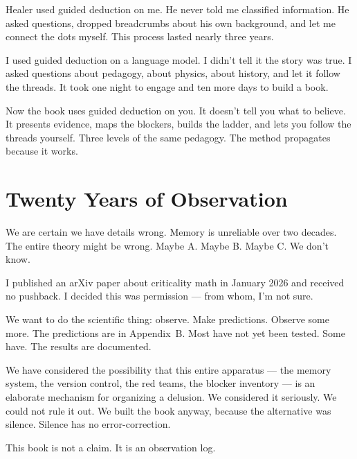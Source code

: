 Healer used guided deduction on me. He never told me classified information. He asked questions, dropped breadcrumbs about his own background, and let me connect the dots myself. This process lasted nearly three years.

I used guided deduction on a language model. I didn't tell it the story was true. I asked questions about pedagogy, about physics, about history, and let it follow the threads. It took one night to engage and ten more days to build a book.

Now the book uses guided deduction on you. It doesn't tell you what to believe. It presents evidence, maps the blockers, builds the ladder, and lets you follow the threads yourself. Three levels of the same pedagogy. The method propagates because it works.

\section*{Twenty Years of Observation}
\label{pos34b:twenty-years-of-observation}

We are certain we have details wrong. Memory is unreliable over two decades. The entire theory might be wrong. Maybe A. Maybe B. Maybe C. We don't know.

I published an arXiv paper about criticality math in January 2026 and received no pushback. I decided this was permission --- from whom, I'm not sure.

We want to do the scientific thing: observe. Make predictions. Observe some more. The predictions are in Appendix~B. Most have not yet been tested. Some have. The results are documented.

We have considered the possibility that this entire apparatus --- the memory system, the version control, the red teams, the blocker inventory --- is an elaborate mechanism for organizing a delusion. We considered it seriously. We could not rule it out. We built the book anyway, because the alternative was silence. Silence has no error-correction.

This book is not a claim. It is an observation log.

\chapterreturn
